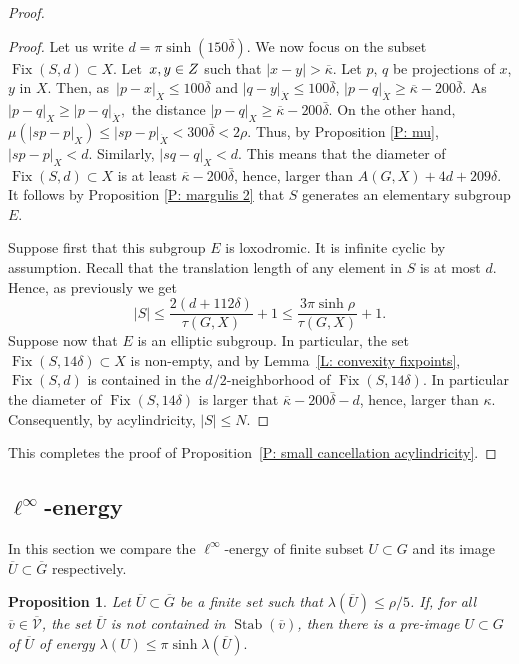 \documentclass[11pt]{article}
\let\mathcal\mathscr
\theoremstyle{plain}
\newtheorem{prop}[thm]{Proposition}
\theoremstyle{definition}
\newcommand{\cX}{\dot{X}}
\newcommand{\qG}{\overline{G}}
\DeclareMathOperator{\Fix}{Fix}
\newcommand{\q}[1]{\overline{#1}}
\newcommand{\stab}[1]{\operatorname{Stab}(#1)}
\begin{document}
\begin{proof}
\begin{proof}
Let us write $d=\pi \sinh (150\bar \delta)$.
We now focus on the subset $\Fix(S,d) \subset X$.
Let~$x,y \in\nobreak Z$ such that $|x-y|>\q \kappa$.
Let $p$, $q$ be projections of $x$, $y$ in $X$. Then, as~$|p-x|_{\cX}\leqslant 100 \bar \delta$ and $ |q-y|_{\cX} \leqslant 100 \bar \delta$, $|p-q|_{\cX}\geqslant \q \kappa - 200 \bar \delta$. As $|p-q|_X\geqslant |p-q|_{\cX},$
the distance $ |p-q|_X \geqslant\q \kappa - 200 \bar \delta.$
On the other hand, $\mu (|sp-p|_X)\leqslant |sp-p|_{\cX} < 300 \bar \delta <2\rho$. Thus, by Proposition \ref{P: mu}, $ |sp-p|_X< d.$ Similarly, $|sq-q|_X < d$.
This means that the diameter of $\Fix(S,d) \subset X$ is at least $\q\kappa -200 \bar \delta$, hence, larger than $A(G,X) +4d+209\delta$.
It follows by Proposition \ref{P: margulis 2} that $S$ generates an elementary subgroup $E$.

Suppose first that this subgroup $E$ is loxodromic.
It is infinite cyclic by assumption.
Recall that the translation length of any element in $S$ is at most $d$.
Hence, as previously we get
\begin{equation*}
|S|\leqslant \frac {2(d+112\delta)}{\tau(G, X)} +1 \leqslant \frac{3 \pi \sinh\rho}{\tau(G, X)}+1.
\end{equation*}
Suppose now that $E$ is an elliptic subgroup.
In particular, the set $\Fix(S,14\delta) \subset X$ is non-empty, and by Lemma~\ref{L: convexity fixpoints}, $\Fix(S,d)$ is contained in the $d/2$-neighborhood of $\Fix(S, 14\delta)$.
In particular the diameter of $\Fix(S, 14\delta)$ is larger that $\q\kappa -200 \bar\delta-d$, hence, larger than $\kappa$.
Consequently, by acylindricity, $|S| \leq N$.
\end{proof}

This completes the proof of Proposition~\ref{P: small cancellation acylindricity}.
\end{proof}

\subsection{\texorpdfstring{$\ell^{\infty}$-energy}{Energy}}

In this section we compare the $\ell^{\infty}$-energy of finite subset $U\subset G$ and its image $\q U\subset \q G$ respectively.

\begin{prop}\label{P: energy lift}
Let $\q U \subset \qG$ be a finite set such that $\lambda(\q U)\leqslant \rho/5$.
If, for all $\q v\in \q {\mathcal V}$, the set $\q U$ is not contained in $\stab{\q v}$, then there is a pre-image $U\subset G $ of $\q U$ of energy
$\lambda(U) \leqslant \pi \sinh \lambda(\q U).$
\end{prop}
\end{document}
